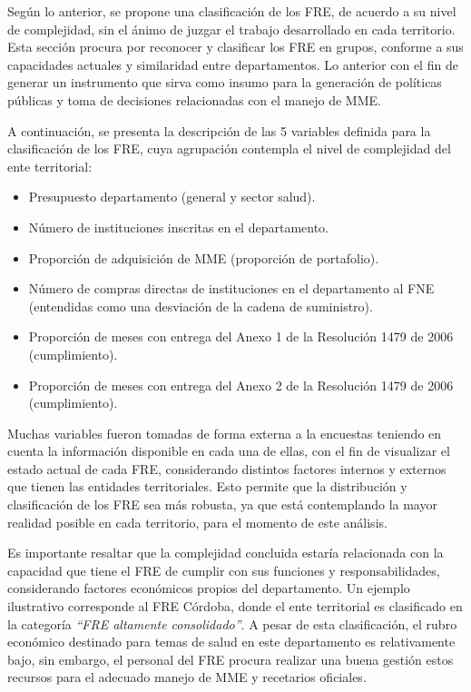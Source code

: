 \documentclass[
]{book}
\begin{document}
Según lo anterior, se propone una clasificación de los FRE, de acuerdo a su nivel de complejidad, sin el ánimo de juzgar el trabajo desarrollado en cada territorio. Esta sección procura por reconocer y clasificar los FRE en grupos, conforme a sus capacidades actuales y similaridad entre departamentos. Lo anterior con el fin de generar un instrumento que sirva como insumo para la generación de políticas públicas y toma de decisiones relacionadas con el manejo de MME.

A continuación, se presenta la descripción de las 5 variables definida para la clasificación de los FRE, cuya agrupación contempla el nivel de complejidad del ente territorial:

\begin{itemize}
\item
  Presupuesto departamento (general y sector salud).
\item
  Número de instituciones inscritas en el departamento.
\item
  Proporción de adquisición de MME (proporción de portafolio).
\item
  Número de compras directas de instituciones en el departamento al FNE (entendidas como una desviación de la cadena de suministro).
\item
  Proporción de meses con entrega del Anexo 1 de la Resolución 1479 de 2006 (cumplimiento).
\item
  Proporción de meses con entrega del Anexo 2 de la Resolución 1479 de 2006 (cumplimiento).
\end{itemize}

Muchas variables fueron tomadas de forma externa a la encuestas teniendo en cuenta la información disponible en cada una de ellas, con el fin de visualizar el estado actual de cada FRE, considerando distintos factores internos y externos que tienen las entidades territoriales. Esto permite que la distribución y clasificación de los FRE sea más robusta, ya que está contemplando la mayor realidad posible en cada territorio, para el momento de este análisis.

Es importante resaltar que la complejidad concluida estaría relacionada con la capacidad que tiene el FRE de cumplir con sus funciones y responsabilidades, considerando factores económicos propios del departamento. Un ejemplo ilustrativo corresponde al FRE Córdoba, donde el ente territorial es clasificado en la categoría \emph{``FRE altamente consolidado''}. A pesar de esta clasificación, el rubro económico destinado para temas de salud en este departamento es relativamente bajo, sin embargo, el personal del FRE procura realizar una buena gestión estos recursos para el adecuado manejo de MME y recetarios oficiales.
\end{document}
